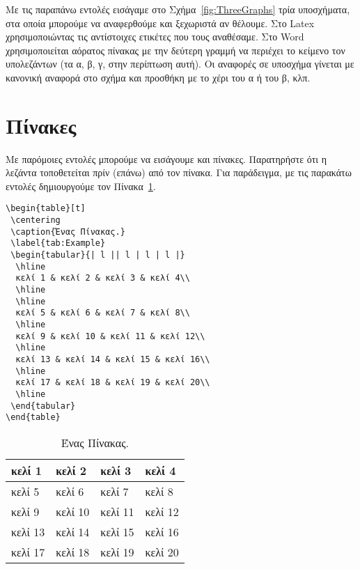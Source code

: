 Με τις παραπάνω εντολές εισάγαμε στο Σχήμα~\ref{fig:ThreeGraphs} τρία 
υποσχήματα, στα οποία μπορούμε να αναφερθούμε και ξεχωριστά αν θέλουμε.
Στο Latex χρησιμοποιώντας τις αντίστοιχες ετικέτες που τους αναθέσαμε.
Στο Word χρησιμοποιείται αόρατος πίνακας με την δεύτερη γραμμή να περιέχει το κείμενο τον υπολεζάντων (τα α, β, γ, στην περίπτωση αυτή).
Οι αναφορές σε υποσχήμα γίνεται με κανονική αναφορά στο σχήμα και προσθήκη με το χέρι του α ή του β, κλπ. 


\section{Πίνακες}
\label{sec:Tables}
Με παρόμοιες εντολές μπορούμε να εισάγουμε και πίνακες.
Παρατηρήστε ότι η λεζάντα τοποθετείται πρίν (επάνω) από τον πίνακα.
Για παράδειγμα, με τις παρακάτω εντολές δημιουργούμε τον Πίνακα~\ref{tab:Example}.

\begin{verbatim}
\begin{table}[t]
 \centering
 \caption{Ένας Πίνακας.}
 \label{tab:Example}
 \begin{tabular}{| l || l | l | l |}
  \hline
  κελί 1 & κελί 2 & κελί 3 & κελί 4\\
  \hline
  \hline
  κελί 5 & κελί 6 & κελί 7 & κελί 8\\
  \hline
  κελί 9 & κελί 10 & κελί 11 & κελί 12\\
  \hline
  κελί 13 & κελί 14 & κελί 15 & κελί 16\\
  \hline
  κελί 17 & κελί 18 & κελί 19 & κελί 20\\
  \hline
 \end{tabular}
\end{table}
\end{verbatim}

\begin{table}[t]
	\centering
	\caption{Ένας Πίνακας.}
	\label{tab:Example}
	\begin{tabular}{| l || l | l | l |}
		\hline
		κελί 1 & κελί 2 & κελί 3 & κελί 4\\
		\hline
		\hline
		κελί 5 & κελί 6 & κελί 7 & κελί 8\\
		\hline
		κελί 9 & κελί 10 & κελί 11 & κελί 12\\
		\hline
		κελί 13 & κελί 14 & κελί 15 & κελί 16\\
		\hline
		κελί 17 & κελί 18 & κελί 19 & κελί 20\\
		\hline
	\end{tabular}
\end{table}


